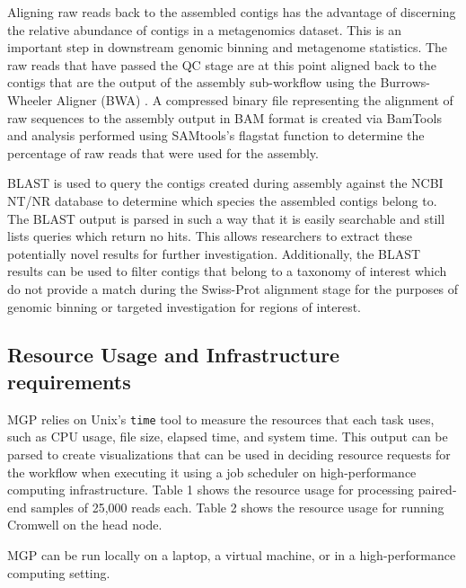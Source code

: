 Aligning raw reads back to the assembled contigs has the advantage of
discerning the relative abundance of contigs in a metagenomics dataset.
This is an important step in downstream genomic binning and metagenome
statistics. The raw reads that have passed the QC stage are at this
point aligned back to the contigs that are the output of the assembly
sub-workflow using the Burrows-Wheeler Aligner (BWA)
\autocite{Li2010-nl}. A compressed binary file representing the
alignment of raw sequences to the assembly output in BAM format is
created via BamTools \autocite{10.1093/bioinformatics/btr174} and
analysis performed using SAMtools's
\autocite{10.1093/bioinformatics/btp352} flagstat function to determine
the percentage of raw reads that were used for the assembly.

BLAST is used to query the contigs created during assembly against the
NCBI NT/NR database to determine which species the assembled contigs
belong to. The BLAST output is parsed in such a way that it is easily
searchable and still lists queries which return no hits. This allows
researchers to extract these potentially novel results for further
investigation. Additionally, the BLAST results can be used to filter
contigs that belong to a taxonomy of interest which do not provide a
match during the Swiss-Prot alignment stage for the purposes of genomic
binning or targeted investigation for regions of interest.

\hypertarget{resource-usage-and-infrastructure-requirements}{%
\subsection{Resource Usage and Infrastructure
requirements}\label{resource-usage-and-infrastructure-requirements}}

MGP relies on Unix's \texttt{time} tool to measure the resources that
each task uses, such as CPU usage, file size, elapsed time, and system
time. This output can be parsed to create visualizations that can be
used in deciding resource requests for the workflow when executing it
using a job scheduler on high-performance computing infrastructure.
Table 1 shows the resource usage for processing paired-end samples of
25,000 reads each. Table 2 shows the resource usage for running Cromwell
on the head node.

MGP can be run locally on a laptop, a virtual machine, or in a
high-performance computing setting.

